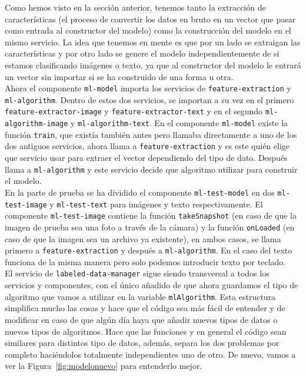 \documentclass[a4paper, 12pt]{book}
\begin{document}
Como hemos visto en la sección anterior, tenemos tanto la extracción de características (el proceso de convertir los datos en bruto en un vector que pasar como entrada al constructor del modelo) como la construcción del modelo en el mismo servicio. La idea que tenemos en mente es que por un lado se extraigan las características y por otro lado se genere el modelo independientemente de si estamos clasificando imágenes o texto, ya que al constructor del modelo le entrará un vector sin importar si se ha construido de una forma u otra.\\
Ahora el componente \texttt{ml-model} importa los servicios de \texttt{feature-extraction} y \texttt{ml-algorithm}. Dentro de estos dos servicios, se importan a su vez en el primero \texttt{feature-extractor-image} y \texttt{feature-extractor-text} y en el segundo \texttt{ml-algorithm-image} y \texttt{ml-algorithm-text}.
En el componente \texttt{ml-model} existe la función \texttt{train}, que existía también antes pero llamaba directamente a uno de los dos antiguos servicios, ahora llama a \texttt{feature-extraction} y es este quién elige que servicio usar para extraer el vector dependiendo del tipo de dato. Después llama a \texttt{ml-algorithm} y este servicio decide que algoritmo utilizar para construir el modelo.\\
En la parte de prueba se ha dividido el componente \texttt{ml-test-model} en dos \texttt{ml-test-image} y \texttt{ml-test-text} para imágenes y texto respectivamente. El componente \texttt{ml-test-image} contiene la función \texttt{takeSnapshot} (en caso de que la imagen de prueba sea una foto a través de la cámara) y la función \texttt{onLoaded} (en caso de que la imagen sea un archivo ya existente), en ambos casos, se llama primero a \texttt{feature-extraction} y después a \texttt{ml-algorithm}. En el caso del texto funciona de la misma manera pero solo podemos introducir texto por teclado.\\
El servicio de \texttt{labeled-data-manager} sigue siendo transversal a todos los servicios y componentes, con el único añadido de que ahora guardamos el tipo de algoritmo que vamos a utilizar en la variable \texttt{mlAlgorithm}.
Esta estructura simplifica mucho las cosas y hace que el código sea más fácil de entender y de modificar en caso de que algún día haya que añadir nuevos tipos de datos o nuevos tipos de algoritmos. Hace que las funciones y en general el código sean similares para distintos tipo de datos, además, separa los dos problemas por completo haciéndolos totalmente independientes uno de otro. De nuevo, vamos a ver la Figura~\ref{fig:modelonuevo} para entenderlo mejor.
\end{document}
